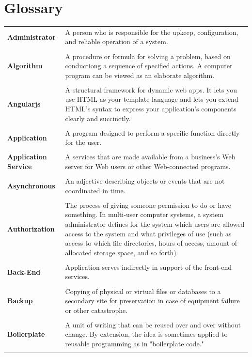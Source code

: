 \documentclass[a4paper,11pt,twoside]{report}
\theoremstyle{definition}
\begin{document}
\chapter*{Glossary}
\begin{longtable}{p{4cm} p{11cm}}


\textbf{Administrator} & A person who is responsible for the upkeep, configuration, and reliable operation of a system.\\ \\
\textbf{Algorithm} & A procedure or formula for solving a problem, based on conductiong a sequence of specified actions. A computer program can be viewed as an elaborate algorithm. \\ \\
\textbf{Angularjs} & A structural framework for dynamic web apps. It lets you use HTML as your template language and lets you extend HTML's syntax to express your application's components clearly and succinctly. \\ \\
\textbf{Application} & A program designed to perform a specific function directly for the user.\\ \\
\textbf{Application Service} & A services that are made available from a business's Web server for Web users or other Web-connected programs. \\ \\
\textbf{Asynchronous} & An adjective describing objects or events that are not coordinated in time.\\ \\
\textbf{Authorization} & The process of giving someone permission to do or have something. In multi-user computer systems, a system administrator defines for the system which users are allowed access to the system and what privileges of use (such as access to which file directories, hours of access, amount of allocated storage space, and so forth). \\ \\
\textbf{Back-End} & Application serves indirectly in support of the front-end services.\\ \\
\textbf{Backup} & Copying of physical or virtual files or databases to a secondary site for preservation in case of equipment failure or other catastrophe. \\ \\
\textbf{Boilerplate} & A unit of writing that can be reused over and over without change. By extension, the idea is sometimes applied to reusable programming as in "boilerplate code."\\ \\

\end{longtable}
\end{document}
